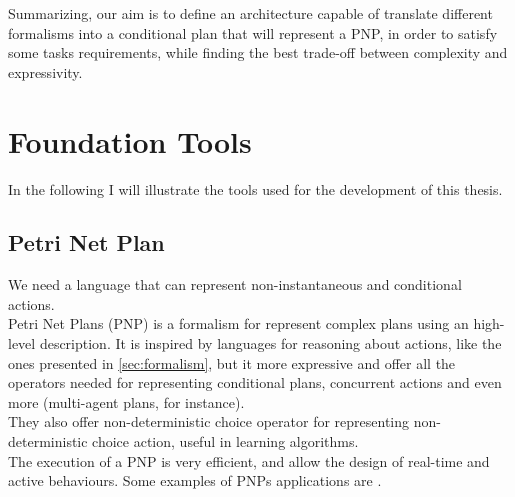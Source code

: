 \documentclass[pdftex,12pt,a4paper]{report}
\begin{document}
\noindent Summarizing, our aim is to define an architecture capable of translate different formalisms into a conditional plan that will represent a PNP, in order to satisfy some tasks requirements, while finding the best trade-off between complexity and expressivity. \\

\chapter{Foundation Tools}\label{sec:foundation}
In the following I will illustrate the tools used for the development of this thesis.

\section{Petri Net Plan}\label{petrinet}
We need a language that can represent non-instantaneous and conditional actions. \\
Petri Net Plans (PNP)\cite{ziparo2006petri}%
\cite{ziparo2008pnp}%
is a formalism for represent complex plans using an high-level description.
It is inspired by languages for reasoning about actions, like the ones presented in \ref{sec:formalism}, but it more expressive and offer all the operators needed for representing conditional plans, concurrent actions and even more (multi-agent plans, for instance).\\
They also offer non-deterministic choice operator for representing non-deterministic choice action, useful in learning algorithms. \\
The execution of a PNP is very efficient, and allow the design of real-time and active behaviours.
Some examples of PNPs applications are \cite{bastianelli2013line}\cite{palamara2008robotic}\cite{farinelli2006assignment}.
\end{document}
